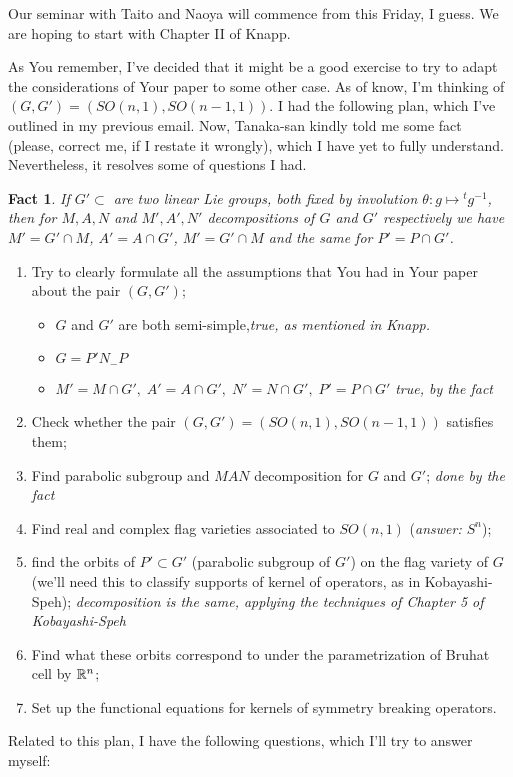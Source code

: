 \documentclass[12pt]{article} %
\newtheorem*{fact}{Fact}
\begin{document}
Our seminar with Taito and Naoya will commence from this Friday, I guess. We are hoping to start with Chapter II of Knapp.

As You remember, I've decided that it might be a good exercise to try to adapt the considerations of Your paper
to some other case. As of know, I'm thinking of $(G,G')=(SO(n,1),SO(n-1,1))$. I had the following plan, which I've
outlined in my previous email. Now, Tanaka-san kindly told me some fact (please, correct me, if I restate it wrongly), which I have yet
to fully understand. Nevertheless, it resolves some of questions I had.
\begin{fact}
	If $G'\subset $ are two linear Lie groups, both fixed by involution $\theta: g\mapsto {^tg^{-1}}$, then for $M,A,N$ and $M',A',N'$
	decompositions of $G$ and $G'$ respectively we have $M'=G'\cap M$, $A'=A\cap G'$, $M'=G'\cap M$ and the same for $P'=P\cap G'$.
\end{fact}
\begin{enumerate}
\item Try to clearly formulate all the assumptions that You had in Your paper about the pair $(G,G')$;
\begin{itemize}
	\item $G$ and $G'$ are both semi-simple,{\it true, as mentioned in Knapp.}
\item $G=P'N_-P$
\item $M'=M\cap G',\;A'=A\cap G',\;N'=N\cap G',\;P'=P\cap G'$ {\it true, by the fact}
\end{itemize}
\item Check whether the pair $(G,G')=(SO(n,1),SO(n-1,1))$ satisfies them;
\item Find parabolic subgroup and $MAN$ decomposition for $G$ and $G'$; {\it done by the fact}
\item Find real and complex flag varieties associated to $SO(n,1)$ (\textit{answer: $S^n$});
\item find the orbits of $P'\subset G'$ (parabolic subgroup of $G'$) on the flag variety of $G$ (we'll need this to classify
supports of kernel of operators, as in Kobayashi-Speh); {\it decomposition is the same, applying the techniques of Chapter 5 of
Kobayashi-Speh }
\item Find what these orbits correspond to under the parametrization of Bruhat cell by $\mathbb{R}^n$;
\item Set up the functional equations for kernels of symmetry breaking operators.
\end{enumerate}
Related to this plan, I have the following questions, which I'll try to answer myself:
\end{document}
